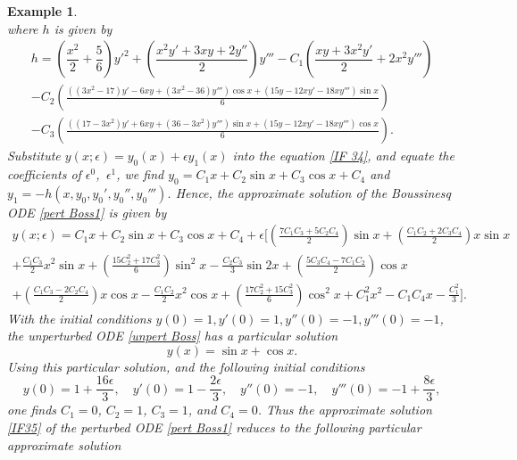 \documentclass[11pt,letter,subeqn]{article}
\newtheorem{example}{Example}[section]
\begin{document}
\begin{example}
\begin{equation}
       \end{equation}
       where $h$ is given by
       \begin{multline}\label{}
         h=\left(\dfrac{x^2}{2}+\dfrac{5}{6}\right){y'}^2+\left(\dfrac{x^2y'+3xy+2y''}{2}\right)y'''-C_1\left(\dfrac{xy+3x^2y'}{2}+2x^2y'''\right) \\
         -C_2\left(\frac{\left((3x^2-17)y'-6xy+(3x^2-36)y'''\right)\cos x+\left(15y-12xy'-18xy'''\right)\sin x}{6}\right) \\ -C_3\left(\frac{\left((17-3x^2)y'+6xy+(36-3x^2)y'''\right)\sin x+\left(15y-12xy'-18xy'''\right)\cos x}{6}\right).
       \end{multline}
       Substitute $y(x;\epsilon)=y_0(x)+\epsilon y_1(x)$ into the equation \eqref{IF 34}, and equate the coefficients of $\epsilon^0$,\, $\epsilon^1$, we find $y_0=C_1x+C_2 \sin x+C_3 \cos x+C_4$ and $y_1=-h(x,y_0,{y_0}',{y_0}'',{y_0}''')$. Hence, the approximate solution of the Boussinesq ODE \eqref{pert Boss1} is given by
       \begin{multline}\label{IF35}
         y(x;\epsilon)= C_1x + C_2 \sin x + C_3 \cos x + C_4 + \epsilon \biggl[\left(\frac{7C_1C_3+5C_2C_4}{2}\right)\sin x + \left(\frac{C_1C_2+2C_3C_4}{2}\right)x\sin x \\ + \frac{C_1C_3 }{2}x^2 \sin x +\left(\frac{15C_2^2 + 17C_3^2}{6}\right)\sin^2 x -\frac{C_2C_3 }{3}\sin 2x + \left(\frac{5C_3C_4-7C_1C_2}{2}\right)\cos x \\+ \left(\frac{C_1C_3-2C_2C_4}{2}\right)x\cos x - \frac{C_1C_2 }{2}x^2 \cos x
        +\left(\frac{17C_2^2+15C_3^2}{6}\right)\cos^2 x +C_1^2 x^2-C_1C_4x-\frac{C_1^2}{3}\biggl].
       \end{multline}
       With the initial conditions $y(0)=1, y'(0)=1, y''(0)=-1, y'''(0)=-1$, the unperturbed ODE \eqref{unpert Boss} has a particular solution
       \begin{equation}\label{Bouss particular soln}
         y(x)=\sin x +\cos x.
       \end{equation}
       Using this particular solution, and the following initial conditions
       \begin{equation}\label{ICs2}
          y(0)=1+\dfrac{16 \epsilon}{3},\quad y'(0)=1-\dfrac{2 \epsilon}{3},\quad y''(0)=-1,\quad y'''(0)=-1+\dfrac{8 \epsilon}{3},
       \end{equation}
        one finds $C_1=0$, $C_2=1$, $C_3=1$, and $C_4=0$. Thus the approximate solution \eqref{IF35} of the perturbed ODE \eqref{pert Boss1} reduces to the following particular approximate solution

\end{example}
\end{document}
